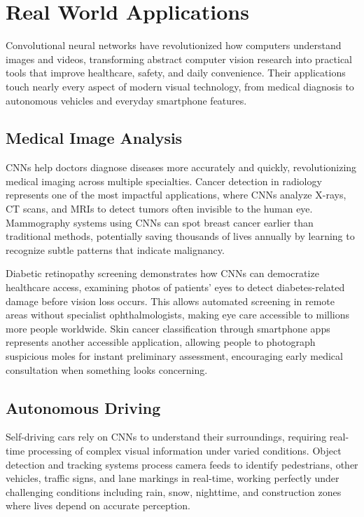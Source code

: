 
\section{Real World Applications }
\label{sec:cnn-real-world}

Convolutional neural networks have revolutionized how computers understand images and videos, transforming abstract computer vision research into practical tools that improve healthcare, safety, and daily convenience. Their applications touch nearly every aspect of modern visual technology, from medical diagnosis to autonomous vehicles and everyday smartphone features.

\subsection{Medical Image Analysis}

CNNs help doctors diagnose diseases more accurately and quickly, revolutionizing medical imaging across multiple specialties. Cancer detection in radiology represents one of the most impactful applications, where CNNs analyze X-rays, CT scans, and MRIs to detect tumors often invisible to the human eye. Mammography systems using CNNs can spot breast cancer earlier than traditional methods, potentially saving thousands of lives annually by learning to recognize subtle patterns that indicate malignancy.

Diabetic retinopathy screening demonstrates how CNNs can democratize healthcare access, examining photos of patients' eyes to detect diabetes-related damage before vision loss occurs. This allows automated screening in remote areas without specialist ophthalmologists, making eye care accessible to millions more people worldwide. Skin cancer classification through smartphone apps represents another accessible application, allowing people to photograph suspicious moles for instant preliminary assessment, encouraging early medical consultation when something looks concerning.

\subsection{Autonomous Driving}

Self-driving cars rely on CNNs to understand their surroundings, requiring real-time processing of complex visual information under varied conditions. Object detection and tracking systems process camera feeds to identify pedestrians, other vehicles, traffic signs, and lane markings in real-time, working perfectly under challenging conditions including rain, snow, nighttime, and construction zones where lives depend on accurate perception.

